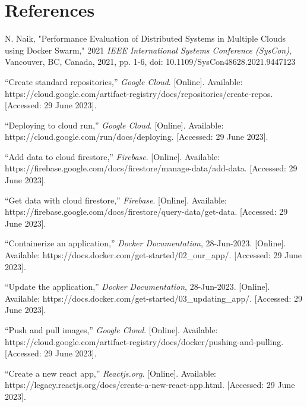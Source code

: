 
\section*{References}
\begin{sloppypar}

  \begin{enumerate}[label={[\arabic*]}]
  
    \item N. Naik, "Performance Evaluation of Distributed Systems in Multiple Clouds using Docker Swarm," 2021 \textit{IEEE International Systems Conference (SysCon)}, Vancouver, BC, Canada, 2021, pp. 1-6, doi: 10.1109/SysCon48628.2021.9447123

    \item “Create standard repositories,” \textit{Google Cloud}. [Online]. Available: https://cloud.google.com/artifact-registry/docs/repositories/create-repos.[Accessed: 29 June 2023].

    \item “Deploying to cloud run,” \textit{Google Cloud}. [Online]. Available: https://cloud.google.com/run/docs/deploying. [Accessed: 29 June 2023].

    \item “Add data to cloud firestore,” \textit{Firebase}. [Online]. Available: https://firebase.google.com/docs/firestore/manage-data/add-data. [Accessed: 29 June 2023].

    \item “Get data with cloud firestore,” \textit{Firebase}. [Online]. Available: https://firebase.google.com/docs/firestore/query-data/get-data. [Accessed: 29 June 2023].

    \item “Containerize an application,” \textit{Docker Documentation}, 28-Jun-2023. [Online]. Available: https://docs.docker.com/get-started/02\_our\_app/. [Accessed: 29 June 2023].


    \item	“Update the application,”\textit{ Docker Documentation}, 28-Jun-2023. [Online]. Available: https://docs.docker.com/get-started/03\_updating\_app/. [Accessed: 29 June 2023].


    \item “Push and pull images,”\textit{ Google Cloud}. [Online]. Available: https://cloud.google.com/artifact-registry/docs/docker/pushing-and-pulling. [Accessed: 29 June 2023].


    \item “Create a new react app,” \textit{Reactjs.org}. [Online]. Available: https://legacy.reactjs.org/docs/create-a-new-react-app.html. [Accessed: 29 June 2023].



\end{enumerate}
\end{sloppypar}
